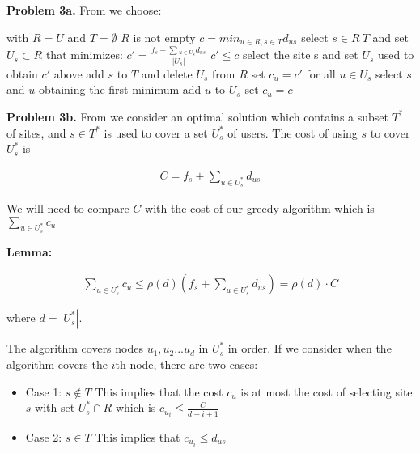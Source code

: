 \documentclass{article}
\begin{document}
\hfill

\textbf{Problem 3a.} From \cite{website:1} we choose:

\begin{codebox}
    \li with $R = U$ and $T = \emptyset$
    \li \While $R$ is not empty \Do
    \li $c = min_{u \in R, s \in T} d_{us}$
    \li select $s \in R \ T$ and set $U_s \subset R$ that minimizes: $c' = \frac{f_s + \sum{}_{u \in U_s}d_{us}}{|U_s|}$
    \li
    \li \If $c' \leq c$ \Then
    \li select the site s and set $U_s$ used to obtain $c'$ above
    \li add $s$ to $T$ and delete $U_s$ from $R$
    \li set $c_u = c'$ for all $u \in U_s$
    \li
    \li \Else
    \li select $s$ and $u$ obtaining the first minimum
    \li add $u$ to $U_s$
    \li set $c_u = c$ \End \End
\end{codebox}

\hfill

\textbf{Problem 3b.} From \cite{website:1} we consider an optimal solution which contains a subset $T^*$ of sites, and $s \in T^*$ is used to cover a set $U_s^*$ of users. The cost of using $s$ to cover $U_s^*$ is

\begin{gather}
    C = f_s + \sum_{u \in U_s^*}d_{us}    
\end{gather}

We will need to compare $C$ with the cost of our greedy algorithm which is $\sum_{u \in U_s^*}c_u$

\hfill

\textbf{Lemma:}

\begin{gather}
    \sum_{u \in U_s^*}c_u \leq \rho(d)(f_s + \sum_{u \in U_s^*}d_{us}) = \rho(d) \cdot C
\end{gather}

where $d = |U_s^*|$.

\hfill
The algorithm covers nodes $u_1, u_2...u_d$ in $U_s^*$ in order. If we consider when the algorithm covers the $i$th node, there are two cases:

\begin{itemize}
    \item Case 1: $s \notin T$
        \subitem This implies that the cost $c_u$ is at most the cost of selecting site $s$ with set $U_s^* \cap R$ which is $c_{u_i} \leq \frac{C}{d-i+1}$
    \item Case 2: $s \in T$
        \subitem This implies that $c_{u_i} \leq d_{us}$
\end{itemize}
\end{document}
